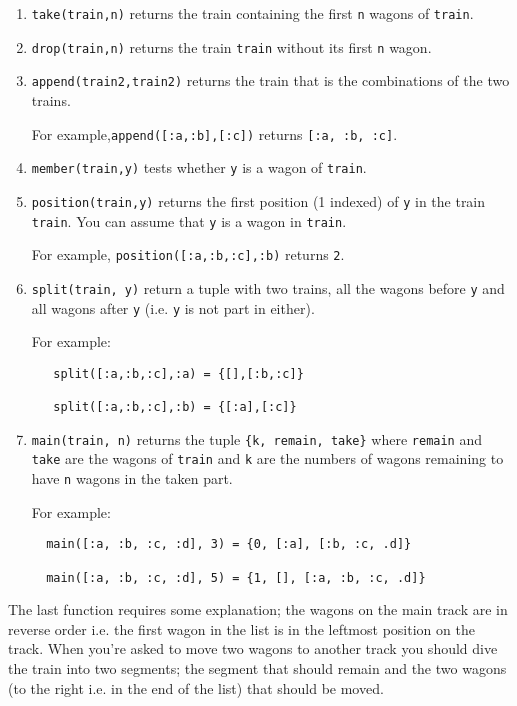 \documentclass[a4paper,11pt]{article}
\begin{document}
\begin{enumerate}

\item \verb+take(train,n)+ returns the train containing the first \verb+n+
  wagons of \verb+train+.

\item \verb+drop(train,n)+ returns the train \verb+train+ without its first
  \verb+n+ wagon.

\item \verb+append(train2,train2)+ returns the train that is the
  combinations of the two trains.

  For example,\verb+append([:a,:b],[:c])+ returns \verb+[:a, :b, :c]+.
  
\item \verb+member(train,y)+ tests whether \verb+y+ is a wagon of \verb+train+.

\item \verb+position(train,y)+ returns the first position (1 indexed) of \verb+y+ in
  the train \verb+train+. You can assume that \verb+y+ is a wagon in
  \verb+train+.

  For example, \verb+position([:a,:b,:c],:b)+ returns \verb+2+.

\item \verb+split(train, y)+ return a tuple with two trains, all the
  wagons before \verb+y+ and all wagons after \verb+y+
  (i.e. \verb+y+ is not part in either).

  For example: 
\begin{verbatim}
   split([:a,:b,:c],:a) = {[],[:b,:c]}

   split([:a,:b,:c],:b) = {[:a],[:c]}
\end{verbatim}

\item \verb+main(train, n)+ returns the tuple
  \verb+{k, remain, take}+ where \verb+remain+ and \verb+take+ are the
  wagons of \verb+train+ and \verb+k+ are the numbers of wagons
  remaining to have \verb+n+ wagons in the taken part.

  For example:
\begin{verbatim}
  main([:a, :b, :c, :d], 3) = {0, [:a], [:b, :c, .d]}

  main([:a, :b, :c, :d], 5) = {1, [], [:a, :b, :c, .d]}
\end{verbatim}  

\end{enumerate}

The last function requires some explanation; the wagons on the main
track are in reverse order i.e. the first wagon in the list is in the
leftmost position on the track. When you're asked to  move two
wagons to another track you should dive the train into two segments;
the segment that should remain and the two wagons (to the right i.e. in
the end of the list) that should be moved.
\end{document}
